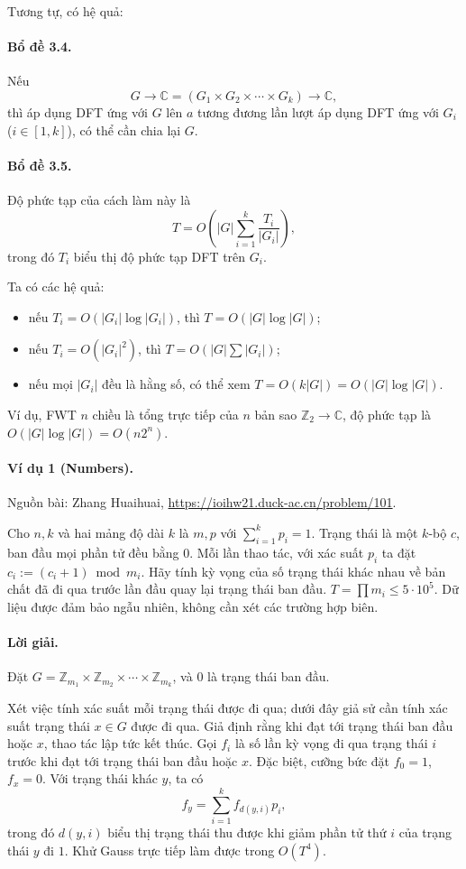 \documentclass[11pt]{article}
\begin{document}
Tương tự, có hệ quả:

\paragraph{Bổ đề 3.4.}
Nếu
\[
  G\to\mathbb C=(G_1\times G_2\times\cdots\times G_k)\to\mathbb C,
\]
thì áp dụng DFT ứng với $G$ lên $a$ tương đương lần lượt áp dụng DFT ứng với
$G_i$ ($i\in[1,k]$), có thể cần chia lại $G$.

\paragraph{Bổ đề 3.5.}
Độ phức tạp của cách làm này là
\[
  T=O\!\left(|G|\sum_{i=1}^{k}\frac{T_i}{|G_i|}\right),
\]
trong đó $T_i$ biểu thị độ phức tạp DFT trên $G_i$.

Ta có các hệ quả:
\begin{itemize}
  \item nếu $T_i=O(|G_i|\log |G_i|)$, thì $T=O(|G|\log |G|)$;
  \item nếu $T_i=O(|G_i|^2)$, thì $T=O(|G|\sum |G_i|)$;
  \item nếu mọi $|G_i|$ đều là hằng số, có thể xem
  $T=O(k|G|)=O(|G|\log |G|)$.
\end{itemize}

Ví dụ, FWT $n$ chiều là tổng trực tiếp của $n$ bản sao $\mathbb Z_2\to\mathbb C$,
độ phức tạp là $O(|G|\log |G|)=O(n2^n)$.

\paragraph{Ví dụ 1 (Numbers).}
Nguồn bài: Zhang Huaihuai, \url{https://ioihw21.duck-ac.cn/problem/101}.

Cho $n,k$ và hai mảng độ dài $k$ là $m,p$ với $\sum_{i=1}^{k}p_i=1$. Trạng thái
là một $k$-bộ $c$, ban đầu mọi phần tử đều bằng $0$. Mỗi lần thao tác, với xác
suất $p_i$ ta đặt $c_i:=(c_i+1)\bmod m_i$. Hãy tính kỳ vọng của số trạng thái
khác nhau về bản chất đã đi qua trước lần đầu quay lại trạng thái ban đầu.
$T=\prod m_i\le 5\cdot 10^5$. Dữ liệu được đảm bảo ngẫu nhiên, không cần xét
các trường hợp biên.

\paragraph{Lời giải.}
Đặt $G=\mathbb Z_{m_1}\times\mathbb Z_{m_2}\times\cdots\times\mathbb Z_{m_k}$,
và $0$ là trạng thái ban đầu.

Xét việc tính xác suất mỗi trạng thái được đi qua; dưới đây giả sử cần tính xác
suất trạng thái $x\in G$ được đi qua. Giả định rằng khi đạt tới trạng thái ban
đầu hoặc $x$, thao tác lập tức kết thúc. Gọi $f_i$ là số lần kỳ vọng đi qua
trạng thái $i$ trước khi đạt tới trạng thái ban đầu hoặc $x$. Đặc biệt, cưỡng
bức đặt $f_0=1$, $f_x=0$. Với trạng thái khác $y$, ta có
\[
  f_y=\sum_{i=1}^{k} f_{d(y,i)}p_i,
\]
trong đó $d(y,i)$ biểu thị trạng thái thu được khi giảm phần tử thứ $i$ của
trạng thái $y$ đi $1$. Khử Gauss trực tiếp làm được trong $O(T^4)$.
\end{document}
